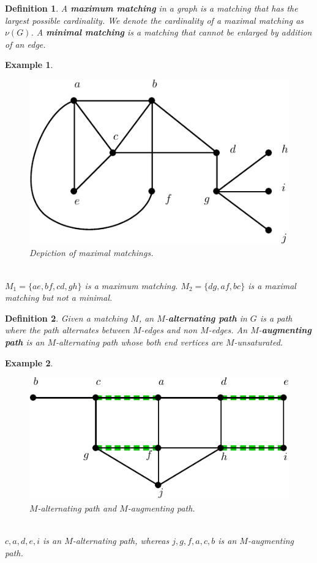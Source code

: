 \documentclass[12pt,a4paper]{article}
\newtheorem{defn}{Definition}[section]
\newtheorem{exmp}{Example}[section]
\theoremstyle{definition}
\begin{document}
\newpage
\begin{defn} A \textbf{maximum matching} in a graph is a matching that has the largest possible cardinality. We denote the cardinality of a maximal matching as $\nu(G)$. A \textbf{minimal matching} is a matching that cannot be enlarged by addition of an edge. 
\end{defn}
\begin{exmp} \
\begin{figure}[hbtp]
\centering
\includegraphics[scale=.9]{images/graph41.pdf}
\caption{Depiction of maximal matchings.}
\end{figure}
\\
$M_1=\{ae,bf,cd,gh\}$ is a maximum matching. $M_2=\{dg,af,bc\}$ is a maximal matching but not a minimal. 
\end{exmp}
\begin{defn} Given a matching $M$, an $M$-\textbf{alternating path} in $G$ is a path where the path alternates between $M$-edges and non $M$-edges. An $M$-\textbf{augmenting path} is an $M$-alternating path whose both end vertices are $M$-unsaturated. 
\end{defn}
\begin{exmp} \ 
\begin{figure}[hbtp]
\centering
\includegraphics[scale=.9]{images/graph42.pdf}
\caption{$M$-alternating path and $M$-augmenting path.}
\end{figure}
\\
$c,a,d,e,i$ is an $M$-alternating path, whereas $j,g,f,a,c,b$ is an $M$-augmenting path. 
\end{exmp}
\end{document}
